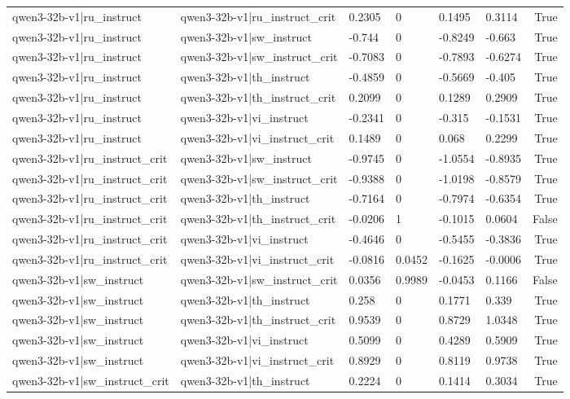 \begin{table}
\begin{tabular}{llllllr}
qwen3-32b-v1|ru_instruct & qwen3-32b-v1|ru_instruct_crit & 0.2305 & 0 & 0.1495 & 0.3114 & True \\
qwen3-32b-v1|ru_instruct & qwen3-32b-v1|sw_instruct & -0.744 & 0 & -0.8249 & -0.663 & True \\
qwen3-32b-v1|ru_instruct & qwen3-32b-v1|sw_instruct_crit & -0.7083 & 0 & -0.7893 & -0.6274 & True \\
qwen3-32b-v1|ru_instruct & qwen3-32b-v1|th_instruct & -0.4859 & 0 & -0.5669 & -0.405 & True \\
qwen3-32b-v1|ru_instruct & qwen3-32b-v1|th_instruct_crit & 0.2099 & 0 & 0.1289 & 0.2909 & True \\
qwen3-32b-v1|ru_instruct & qwen3-32b-v1|vi_instruct & -0.2341 & 0 & -0.315 & -0.1531 & True \\
qwen3-32b-v1|ru_instruct & qwen3-32b-v1|vi_instruct_crit & 0.1489 & 0 & 0.068 & 0.2299 & True \\
qwen3-32b-v1|ru_instruct_crit & qwen3-32b-v1|sw_instruct & -0.9745 & 0 & -1.0554 & -0.8935 & True \\
qwen3-32b-v1|ru_instruct_crit & qwen3-32b-v1|sw_instruct_crit & -0.9388 & 0 & -1.0198 & -0.8579 & True \\
qwen3-32b-v1|ru_instruct_crit & qwen3-32b-v1|th_instruct & -0.7164 & 0 & -0.7974 & -0.6354 & True \\
qwen3-32b-v1|ru_instruct_crit & qwen3-32b-v1|th_instruct_crit & -0.0206 & 1 & -0.1015 & 0.0604 & False \\
qwen3-32b-v1|ru_instruct_crit & qwen3-32b-v1|vi_instruct & -0.4646 & 0 & -0.5455 & -0.3836 & True \\
qwen3-32b-v1|ru_instruct_crit & qwen3-32b-v1|vi_instruct_crit & -0.0816 & 0.0452 & -0.1625 & -0.0006 & True \\
qwen3-32b-v1|sw_instruct & qwen3-32b-v1|sw_instruct_crit & 0.0356 & 0.9989 & -0.0453 & 0.1166 & False \\
qwen3-32b-v1|sw_instruct & qwen3-32b-v1|th_instruct & 0.258 & 0 & 0.1771 & 0.339 & True \\
qwen3-32b-v1|sw_instruct & qwen3-32b-v1|th_instruct_crit & 0.9539 & 0 & 0.8729 & 1.0348 & True \\
qwen3-32b-v1|sw_instruct & qwen3-32b-v1|vi_instruct & 0.5099 & 0 & 0.4289 & 0.5909 & True \\
qwen3-32b-v1|sw_instruct & qwen3-32b-v1|vi_instruct_crit & 0.8929 & 0 & 0.8119 & 0.9738 & True \\
qwen3-32b-v1|sw_instruct_crit & qwen3-32b-v1|th_instruct & 0.2224 & 0 & 0.1414 & 0.3034 & True \\

\end{tabular}
\end{table}

